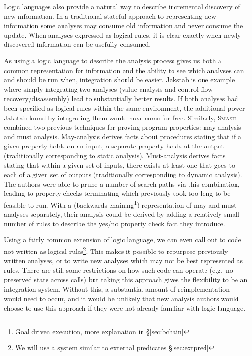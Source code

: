 Logic languages also provide a natural way to describe incremental discovery of new information.
In a traditional stateful approach to representing new information some analyses may consume old information and never consume the update.
When analyses expressed as logical rules, it is clear exactly when newly discovered information can be usefully consumed.

As using a logic language to describe the analysis process gives us both a common representation for information and the ability to see which analyses can and should be run when, integration should be easier.
Jakstab\cite{jakstab} is one example where simply integrating two analyses (value analysis and control flow recovery/disassembly) lead to substantially better results.
If both analyses had been specified as logical rules within the same environment, the additional power Jakstab found by integrating them would have come for free.
Similarly, \textsc{Smash}\cite{maymust} combined two previous techniques for proving program properties: may analysis and must analysis.
May-analysis derives facts about procedures stating that if a given property holds on an input, a separate property holds at the output (traditionally corresponding to static analysis).
Must-analysis derives facts stating that within a given set of inputs, there exists at least one that goes to each of a given set of outputs (traditionally corresponding to dynamic analysis).
The authors were able to prune a number of search paths via this combination, leading to property checks terminating which previously took too long to be feasible to run.
With a (backwards-chaining\footnote{Goal driven execution, more explanation in \S\ref{sec:bchain}}) representation of may and must analyses separately, their analysis could be derived by adding a relatively small number of rules to describe the yes/no property check fact they introduce.

Using a fairly common extension of logic language, we can even call out to code not written as logical rules\footnote{We will use a system similar to external predicates \S\ref{sec:extpred}}.
This makes it possible to repurpose previously written analyses, or to write new analyses which may not be best represented as rules.
There are still some restrictions on how such code can operate (e.g.\ no preserved state across calls) but taking this approach gives the flexibility to be an integration system.
Without this, a substantial amount of reimplementation would need to occur, and it would be unlikely that new analysis authors would choose to use this approach if they were not already familiar with logic language.

